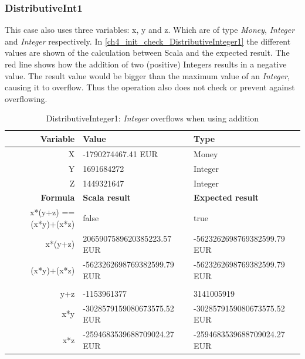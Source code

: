 \subsubsection{DistributiveInt1}
This case also uses three variables: x, y and z. Which are of type \textit{Money}, \textit{Integer} and \textit{Integer} respectively. In \autoref{ch4_init_check_DistributiveInteger1} the different values are shown of the calculation between Scala and the expected result. The red line shows how the addition of two (positive) Integers results in a negative value. The result value would be bigger than the maximum value of an \textit{Integer}, causing it to overflow. Thus the operation also does not check or prevent against overflowing. 
\FloatBarrier
\begin{table}[!ht]
\centering
\begin{tabular}{rll}
\hline
\textbf{Variable}      & \textbf{Value}              & \textbf{Type}               \\ \hline
X                      & -1790274467.41 EUR          & Money                       \\
Y                      & 1691684272                  & Integer                     \\
Z                      & 1449321647                  & Integer                     \\ \hline
\textbf{Formula}       & \textbf{Scala result}       & \textbf{Expected result}    \\ \hline
x*(y+z) == (x*y)+(x*z) & false                       & true                        \\
x*(y+z)                & 2065907589620385223.57 EUR  & -5623262698769382599.79 EUR \\
(x*y)+(x*z)            & -5623262698769382599.79 EUR & -5623262698769382599.79 EUR \\
                       &                             &                             \\
y+z                    & -1153961377                 & 3141005919                  \\
x*y                    & -3028579159080673575.52 EUR & -3028579159080673575.52 EUR \\
x*z                    & -2594683539688709024.27 EUR & -2594683539688709024.27 EUR \\ \hline
\end{tabular}
\caption{DistributiveInteger1: \textit{Integer} overflows when using addition}
\label{ch4_init_check_DistributiveInteger1}
\end{table}
\FloatBarrier

